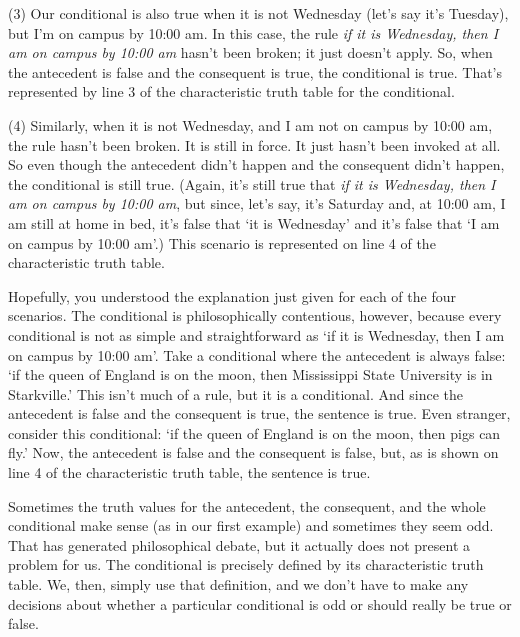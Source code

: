 \begin{ebullet}	
\item[(3)] Our conditional is also true when it is not Wednesday (let's say it's Tuesday), but I'm on campus by 10:00 am. In this case, the rule \textit{if it is Wednesday, then I am on campus by 10:00 am} hasn't been broken; it just doesn't apply. So, when the antecedent is false and the consequent is true, the conditional is true. That's represented by line 3 of the characteristic truth table for the conditional. 
\item[(4)] Similarly, when it is not Wednesday, and I am not on campus by 10:00 am, the rule hasn't been broken. It is still in force. It just hasn't been invoked at all. So even though the antecedent didn't happen and the consequent didn't happen, the conditional is still true. (Again, it's still true that \textit{if it is Wednesday, then I am on campus by 10:00 am}, but since, let's say, it's Saturday and, at 10:00 am, I am still at home in bed, it's false that `it is Wednesday' and it's false that `I am on campus by 10:00 am'.) This scenario is represented on line 4 of the characteristic truth table.
\end{ebullet}

Hopefully, you understood the explanation just given for each of the four scenarios. The conditional is philosophically contentious, however, because every conditional is not as simple and straightforward as `if it is Wednesday, then I am on campus by 10:00 am'. Take a conditional where the antecedent is always false: `if the queen of England is on the moon, then Mississippi State University is in Starkville.' This isn't much of a rule, but it is a conditional. And since the antecedent is false and the consequent is true, the sentence is true. Even stranger, consider this conditional: `if the queen of England is on the moon, then pigs can fly.' Now, the antecedent is false and the consequent is false, but, as is shown on line 4 of the characteristic truth table, the sentence is true. 

Sometimes the truth values for the antecedent, the consequent, and the whole conditional make sense (as in our first example) and sometimes they seem odd. That has generated philosophical debate, but it actually does not present a problem for us. The conditional is precisely defined by its characteristic truth table. We, then, simply use that definition, and we don't have to make any decisions about whether a particular conditional is odd or should really be true or false. 

